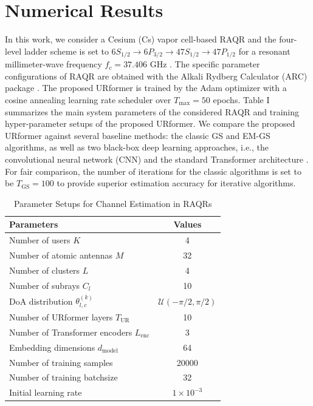 \documentclass[journal]{IEEEtran}
\begin{document}
\section{Numerical Results}
In this work, we consider a Cesium (Cs) vapor cell-based RAQR and the four-level ladder scheme is set to $6S_{1/2} \to 6P_{3/2} \to 47S_{1/2} \to 47P_{1/2}$ for a resonant millimeter-wave frequency $f_c = 37.406$ GHz \cite{anderson2020rydberg}. The specific parameter configurations of RAQR are obtained with the Alkali Rydberg Calculator (ARC) package \cite{vsibalic2017arc}. The proposed URformer is trained by the Adam optimizer with a cosine annealing learning rate scheduler over $T_\text{max} = 50$ epochs. Table I summarizes the main system parameters of the considered RAQR and training hyper-parameter setups of the proposed URformer. We compare the proposed URformer against several baseline methods: the classic GS and EM-GS algorithms, as well as two black-box deep learning approaches, i.e., the convolutional neural network (CNN) and the standard Transformer architecture \cite{b8}. For fair comparison, the number of iterations for the classic algorithms is set to be $T_\text{GS}=100$ to provide superior estimation accuracy for iterative algorithms. 

\begin{table}[t!]
\centering
\caption{ Parameter Setups for Channel Estimation in RAQRs}
\label{tab:params}
\begin{tabular}{l|c}
\hline
\textbf{Parameters} & \textbf{Values} \\
\hline
Number of users $K$ & 4 \\
Number of atomic antennas $M$ & 32 \\
Number of clusters $L$ & 4 \\
Number of subrays $C_l$ & 10 \\
DoA distribution $\theta_{l,c}^{(k)}$ &$\mathcal{U}(-\pi/2, \pi/2)$ \\
Number of URformer layers $T_\text{UR}$ & 10 \\
Number of Transformer encoders $L_\text{enc}$ & 3 \\
Embedding dimensions $d_{\text{model}}$ & 64 \\
Number of training samples & 20000 \\
Number of training batchsize & 32 \\
Initial learning rate & $1\times 10^{-3}$ \\
\hline
\end{tabular}
\end{table}
\end{document}
